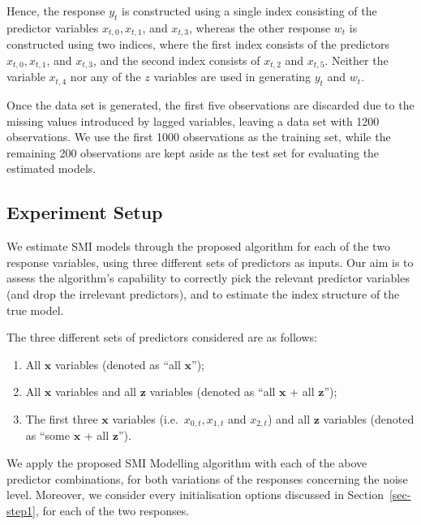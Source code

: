 \documentclass[
  11pt,
  a4paper,
]{report}
\providecommand{\tightlist}{%
  \setlength{\itemsep}{0pt}\setlength{\parskip}{0pt}}\usepackage{longtable,booktabs,array}
\begin{document}
Hence, the response \(y_{t}\) is constructed using a single index
consisting of the predictor variables \(x_{t,0}, x_{t,1}\), and
\(x_{t,3}\), whereas the other response \(w_{t}\) is constructed using
two indices, where the first index consists of the predictors
\(x_{t,0}, x_{t,1}\), and \(x_{t,3}\), and the second index consists of
\(x_{t,2}\) and \(x_{t,5}\). Neither the variable \(x_{t,4}\) nor any of
the \(z\) variables are used in generating \(y_{t}\) and \(w_{t}\).

Once the data set is generated, the first five observations are
discarded due to the missing values introduced by lagged variables,
leaving a data set with 1200 observations. We use the first 1000
observations as the training set, while the remaining 200 observations
are kept aside as the test set for evaluating the estimated models.

\subsection{Experiment Setup}\label{sec-exp}

We estimate SMI models through the proposed algorithm for each of the
two response variables, using three different sets of predictors as
inputs. Our aim is to assess the algorithm's capability to correctly
pick the relevant predictor variables (and drop the irrelevant
predictors), and to estimate the index structure of the true model.

The three different sets of predictors considered are as follows:

\begin{enumerate}
\def\labelenumi{\arabic{enumi}.}
\tightlist
\item
  All \(\bm{x}\) variables (denoted as ``all \(\bm{x}\)'');
\item
  All \(\bm{x}\) variables and all \(\bm{z}\) variables (denoted as
  ``all \(\bm{x}\) + all \(\bm{z}\)'');
\item
  The first three \(\bm{x}\) variables (i.e.~\(x_{0,t}, x_{1,t}\) and
  \(x_{2,t}\)) and all \(\bm{z}\) variables (denoted as ``some
  \(\bm{x}\) + all \(\bm{z}\)'').
\end{enumerate}

We apply the proposed SMI Modelling algorithm with each of the above
predictor combinations, for both variations of the responses concerning
the noise level. Moreover, we consider every initialisation options
discussed in Section~\ref{sec-step1}, for each of the two responses.
\end{document}
